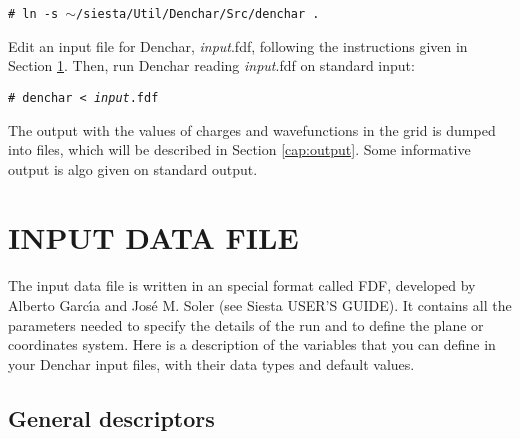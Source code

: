  {\tt \# ln -s $\sim$/siesta/Util/Denchar/Src/denchar . }

 Edit an input file for {\sc Denchar}, {\it input}.fdf, following the 
 instructions given in Section \ref{cap:input}. Then,
 run  {\sc Denchar} reading {\it input}.fdf on
 standard input:


 {\tt \# denchar < {\it input}.fdf } 


 The output with the values of charges and wavefunctions
 in the grid is dumped into files, which will be described
 in Section \ref{cap:output}. Some informative output is
 algo given on standard output.

\section{INPUT DATA FILE}
\label{cap:input} 

The input data file is written in an special format called FDF, developed
by Alberto Garc\'{\i}a and Jos\'e M. Soler (see {\sc Siesta} USER'S GUIDE).
It contains all the parameters needed to specify the details
of the run and to define the plane or coordinates system.
Here is a description of the variables that you can define in your 
{\sc Denchar} input files,
with their data types and default values.

\vspace{5pt}
\subsection{General descriptors}

